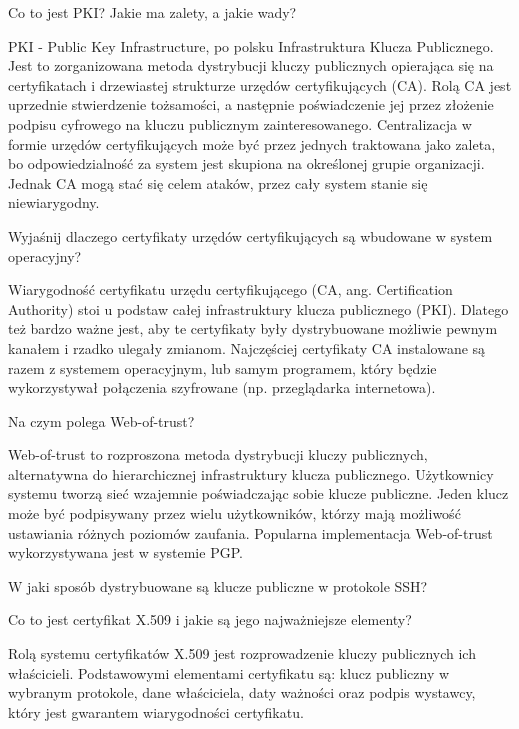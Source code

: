 \documentclass[answers,11pt]{exam}
\begin{document}
\begin{questions}

\question Co to jest PKI? Jakie ma zalety, a jakie wady?
\begin{solution}
PKI - Public Key Infrastructure, po polsku Infrastruktura Klucza Publicznego. Jest to zorganizowana metoda dystrybucji kluczy publicznych opierająca się na certyfikatach i drzewiastej strukturze urzędów certyfikujących (CA). Rolą CA jest uprzednie stwierdzenie tożsamości, a następnie poświadczenie jej przez złożenie podpisu cyfrowego na kluczu publicznym zainteresowanego. Centralizacja w formie urzędów certyfikujących może być przez jednych traktowana jako zaleta, bo odpowiedzialność za system jest skupiona na określonej grupie organizacji. Jednak CA mogą stać się celem ataków, przez cały system stanie się niewiarygodny.
\end{solution}

\question Wyjaśnij dlaczego certyfikaty urzędów certyfikujących są wbudowane w system operacyjny?
\begin{solution}
Wiarygodność certyfikatu urzędu certyfikującego (CA, ang. Certification Authority) stoi u podstaw całej infrastruktury klucza publicznego (PKI). Dlatego też bardzo ważne jest, aby te certyfikaty były dystrybuowane możliwie pewnym kanałem i rzadko ulegały zmianom. Najczęściej certyfikaty CA instalowane są razem z systemem operacyjnym, lub samym programem, który będzie wykorzystywał połączenia szyfrowane (np. przeglądarka internetowa).
\end{solution}

\question Na czym polega Web-of-trust?
\begin{solution}
Web-of-trust to rozproszona metoda dystrybucji kluczy publicznych, alternatywna do hierarchicznej infrastruktury klucza publicznego. Użytkownicy systemu tworzą sieć wzajemnie poświadczając sobie klucze publiczne. Jeden klucz może być podpisywany przez wielu użytkowników, którzy mają możliwość ustawiania różnych poziomów zaufania. Popularna implementacja Web-of-trust wykorzystywana jest w systemie PGP.
\end{solution}

\question W jaki sposób dystrybuowane są klucze publiczne w protokole SSH?

\question Co to jest certyfikat X.509 i jakie są jego najważniejsze elementy?
\begin{solution}
Rolą systemu certyfikatów X.509 jest rozprowadzenie kluczy publicznych ich właścicieli. Podstawowymi elementami certyfikatu są: klucz publiczny w wybranym protokole, dane właściciela, daty ważności oraz podpis wystawcy, który jest gwarantem wiarygodności certyfikatu.
\end{solution}

\end{questions}
\end{document}
